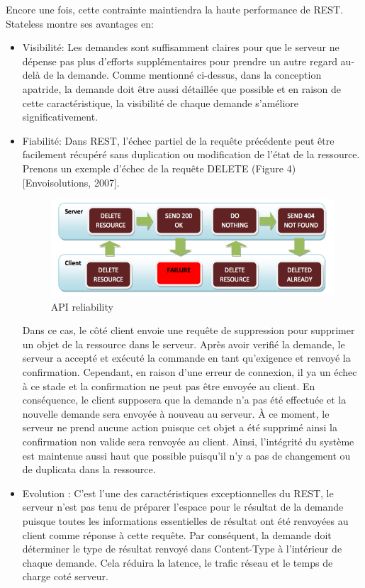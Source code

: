 Encore une fois, cette contrainte maintiendra la haute performance de REST. Stateless montre ses avantages en:
\begin{itemize}
\item Visibilité: Les demandes sont suffisamment claires pour que le serveur ne dépense pas plus d'efforts supplémentaires pour prendre un autre regard au-delà de la demande. Comme mentionné ci-dessus, dans la conception apatride, la demande doit être aussi détaillée que possible et en raison de cette caractéristique, la visibilité de chaque demande s'améliore significativement.
\item Fiabilité: Dans REST, l'échec partiel de la requête précédente peut être facilement récupéré sans duplication ou modification de l'état de la ressource. Prenons un exemple d'échec de la requête DELETE (Figure 4) [Envoisolutions, 2007].
\begin{figure}[! ht ]
			\centering
			\includegraphics[scale=.4]{./images/api_reliability.png}
			\caption {API reliability}
		\end{figure}
Dans ce cas, le côté client envoie une requête de suppression pour supprimer un objet de la ressource dans le serveur. Après avoir verifié la demande, le serveur a accepté et exécuté la commande en tant qu'exigence et renvoyé la confirmation. Cependant, en raison d'une erreur de connexion, il ya un échec à ce stade et la confirmation ne peut pas être envoyée au client. En conséquence, le client supposera que la demande n'a pas été effectuée et la nouvelle demande sera envoyée à nouveau au serveur. À ce moment, le serveur ne prend aucune action puisque cet objet a été supprimé ainsi la confirmation non valide sera renvoyée au client. Ainsi, l'intégrité du système est maintenue aussi haut que possible puisqu'il n'y a pas de changement ou de duplicata dans la ressource.

\item Evolution : C'est l'une des caractéristiques exceptionnelles du REST, le serveur n'est pas tenu de préparer l'espace pour le résultat de la demande puisque toutes les informations essentielles de résultat ont été renvoyées au client comme réponse à cette requête. Par conséquent, la demande doit déterminer le type de résultat renvoyé dans Content-Type à l'intérieur de chaque demande. Cela réduira la latence, le trafic réseau et le temps de charge coté serveur.
\end{itemize}

